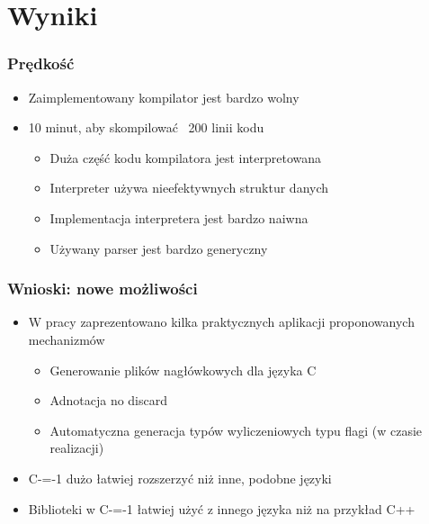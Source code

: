 \section{Wyniki}

\begin{frame}
	\frametitle{Prędkość}

	\begin{itemize}
		\item Zaimplementowany kompilator jest bardzo wolny
		\item 10 minut, aby skompilować ~200 linii kodu\begin{itemize}
			\item Duża część kodu kompilatora jest interpretowana
			\item Interpreter używa nieefektywnych struktur danych
			\item Implementacja interpretera jest bardzo naiwna
			\item Używany parser jest bardzo generyczny
		\end{itemize}
	\end{itemize}

\end{frame}

\begin{frame}
	\frametitle{Wnioski: nowe możliwości}

	\begin{itemize}
		\item W pracy zaprezentowano kilka praktycznych aplikacji proponowanych mechanizmów\begin{itemize}
			\item Generowanie plików nagłówkowych dla języka C
			\item Adnotacja no discard
			\item Automatyczna generacja typów wyliczeniowych typu flagi (w czasie realizacji)
		\end{itemize}
		\item C-=-1 dużo łatwiej rozszerzyć niż inne, podobne języki
		\item Biblioteki w C-=-1 łatwiej użyć z innego języka niż na przykład C++
	\end{itemize}

\end{frame}

